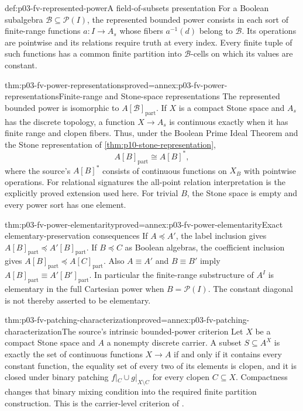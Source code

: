 \begin{hbdefinition}{def:p03-fv-represented-power}{A field-of-subsets presentation}
For a Boolean subalgebra \(\mathcal B\subseteq\mathcal P(I)\), the
represented bounded power consists in each sort of finite-range functions
\(a:I\to A_s\) whose fibers \(a^{-1}(d)\) belong to \(\mathcal B\).
Its operations are pointwise and its relations require truth at every index.
Every finite tuple of such functions has a common finite partition into
\(\mathcal B\)-cells on which its values are constant.
\end{hbdefinition}

\begin{hbtheorem}{thm:p03-fv-power-representations}{proved=annex:p03-fv-power-representations}{Finite-range and Stone-space representations}
The represented bounded power is isomorphic to
\(A[\mathcal B]_{\mathrm{part}}\). If \(X\) is a compact Stone space
and \(A_s\) has the discrete topology, a function \(X\to A_s\) is
continuous exactly when it has finite range and clopen fibers. Thus, under
the Boolean Prime Ideal Theorem and the Stone representation of
\cref{thm:p10-stone-representation},
\[
             A[B]_{\mathrm{part}}\cong A[B]^*,
\]
where the source's \(A[B]^*\) consists of continuous functions on \(X_B\)
with pointwise operations. For relational signatures the all-point relation
interpretation is the explicitly proved extension used here. For trivial
\(B\), the Stone space is empty and every power sort has one element.
\end{hbtheorem}

\begin{hbtheorem}{thm:p03-fv-power-elementarity}{proved=annex:p03-fv-power-elementarity}{Exact elementary-preservation consequences}
If \(A\preccurlyeq A'\), the label inclusion gives
\(A[B]_{\mathrm{part}}\preccurlyeq A'[B]_{\mathrm{part}}\).
If \(B\preccurlyeq C\) as Boolean algebras, the coefficient inclusion gives
\(A[B]_{\mathrm{part}}\preccurlyeq A[C]_{\mathrm{part}}\).
Also \(A\equiv A'\) and \(B\equiv B'\) imply
\(A[B]_{\mathrm{part}}\equiv A'[B']_{\mathrm{part}}\).
In particular the finite-range substructure of \(A^I\) is elementary in
the full Cartesian power when \(B=\mathcal P(I)\). The constant diagonal
is not thereby asserted to be elementary.
\end{hbtheorem}

\begin{hbtheorem}{thm:p03-fv-patching-characterization}{proved=annex:p03-fv-patching-characterization}{The source's intrinsic bounded-power criterion}
Let \(X\) be a compact Stone space and \(A\) a nonempty discrete carrier.
A subset \(S\subseteq A^X\) is exactly the set of continuous functions
\(X\to A\) if and only if it contains every constant function,
the equality set of every two of its elements is clopen, and it is closed
under binary patching \(f|_C\cup g|_{X\setminus C}\) for every clopen
\(C\subseteq X\). Compactness changes that binary mixing condition into
the required finite partition construction. This is the carrier-level
criterion of \cite[IV\S5, Theorem~5.6, pp.~143--144]{BurrisSankappanavar2012}.
\end{hbtheorem}

